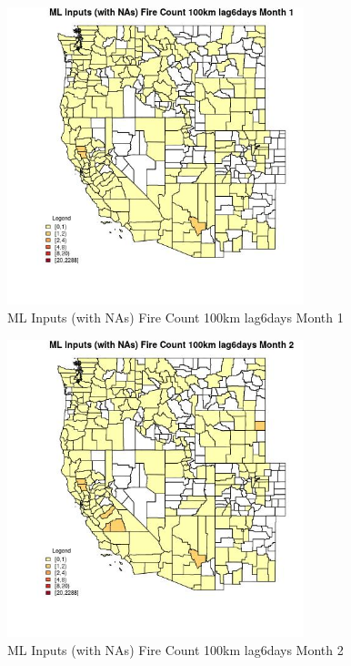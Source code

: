 \begin{figure} 
\centering  
\includegraphics[width=0.77\textwidth]{Code_Outputs/Report_ML_input_PM25_Step4_part_e_de_duplicated_aves_compiled_2019-05-20wNAs_CountyFire_Count_100km_lag6daysmedianMonth1.jpg} 
\caption{\label{fig:Report_ML_input_PM25_Step4_part_e_de_duplicated_aves_compiled_2019-05-20wNAsCountyFire_Count_100km_lag6daysmedianMonth1}ML Inputs (with NAs) Fire Count 100km lag6days Month 1} 
\end{figure} 
 

\begin{figure} 
\centering  
\includegraphics[width=0.77\textwidth]{Code_Outputs/Report_ML_input_PM25_Step4_part_e_de_duplicated_aves_compiled_2019-05-20wNAs_CountyFire_Count_100km_lag6daysmedianMonth2.jpg} 
\caption{\label{fig:Report_ML_input_PM25_Step4_part_e_de_duplicated_aves_compiled_2019-05-20wNAsCountyFire_Count_100km_lag6daysmedianMonth2}ML Inputs (with NAs) Fire Count 100km lag6days Month 2} 
\end{figure} 
 

